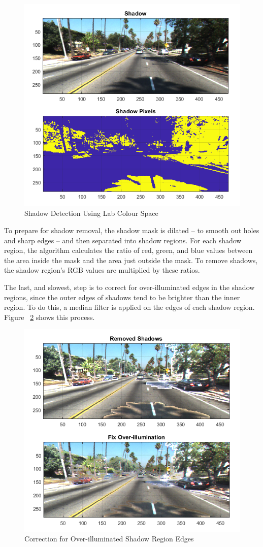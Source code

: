 \documentclass[11pt,journal]{IEEEtran}
\begin{document}
\begin{figure}[h]
\centerline{\includegraphics[width=0.9\columnwidth]{X1.png}}
\caption{Shadow Detection Using Lab Colour Space}
\label{Shadow1}
\end{figure}

To prepare for shadow removal, the shadow mask is dilated – to smooth out holes and sharp edges – and then separated into shadow regions. For each shadow region, the algorithm calculates the ratio of red, green, and blue values between the area inside the mask and the area just outside the mask. To remove shadows, the shadow region's RGB values are multiplied by these ratios.

The last, and slowest, step is to correct for over-illuminated edges in the shadow regions, since the outer edges of shadows tend to be brighter than the inner region. To do this, a median filter is applied on the edges of each shadow region. Figure ~\ref{Shadow3} shows this process.

\begin{figure}[ht]
\centerline{\includegraphics[width=0.9\columnwidth]{X3.png}}
\caption{Correction for Over-illuminated Shadow Region Edges}
\label{Shadow3}
\end{figure}
\end{document}
